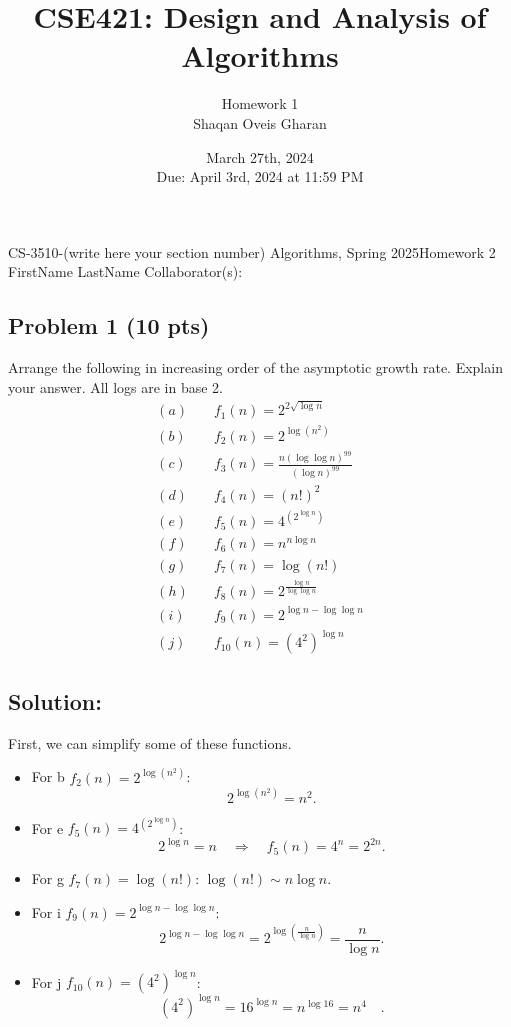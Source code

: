 \documentclass[12pt]{article}
\title{\textbf{CSE421: Design and Analysis of Algorithms}}
\author{Homework 1 \\ Shaqan Oveis Gharan}
\date{March 27th, 2024 \\ Due: April 3rd, 2024 at 11:59 PM}
\begin{document}
\noindent CS-3510-(write here your section number) Algorithms, Spring 2025\hfill Homework 2\\
FirstName LastName \hfill Collaborator(s):

\hrulefill

\subsection*{Problem 1 (10 pts)}
Arrange the following in increasing order of the asymptotic growth rate. Explain your answer. All logs are in base 2.
\begin{align*}
    (a) \quad & f_1(n) = 2^{2\sqrt{\log n}} \\
    (b) \quad & f_2(n) = 2^{\log(n^2)} \\
    (c) \quad & f_3(n) = \frac{n (\log \log n)^{99}}{(\log n)^{99}} \\
    (d) \quad & f_4(n) = (n!)^2\\
    (e) \quad & f_5(n) = 4^{(2^{\log n})} \\
    (f) \quad & f_6(n) = n^{n \log n} \\
    (g) \quad & f_7(n) = \log(n!) \\
    (h) \quad & f_8(n) = 2^{\frac{\log n}{\log \log n}} \\
    (i) \quad & f_9(n) = 2^{\log n - \log \log n} \\
    (j) \quad & f_{10}(n) = (4^2)^{\log n}
\end{align*}

\subsection*{Solution:}
First, we can simplify some of these functions.

\begin{itemize}
    \item For b \(f_2(n)=2^{\log (n^2)}\):  
    \[
    2^{\log (n^2)} = n^2.
    \]
    
    \item For e \(f_5(n)=4^{(2^{\log n})}\):  
    \[
    2^{\log n} = n \quad \Longrightarrow \quad f_5(n)=4^n = 2^{2n}.
    \]
    
    \item For g \(f_7(n)=\log(n!)\):  \(\log(n!) \sim n\log n\).

    \item For i \(f_9(n)=2^{\log n-\log \log n}\):  
    \[
    2^{\log n-\log \log n} = 2^{\log\left(\frac{n}{\log n}\right)} = \frac{n}{\log n}.
    \]
    
    \item For j \(f_{10}(n)=(4^2)^{\log n}\):  
    \[
    (4^2)^{\log n} = 16^{\log n} = n^{\log 16} = n^4 \quad.
    \]
\end{itemize}
\end{document}
